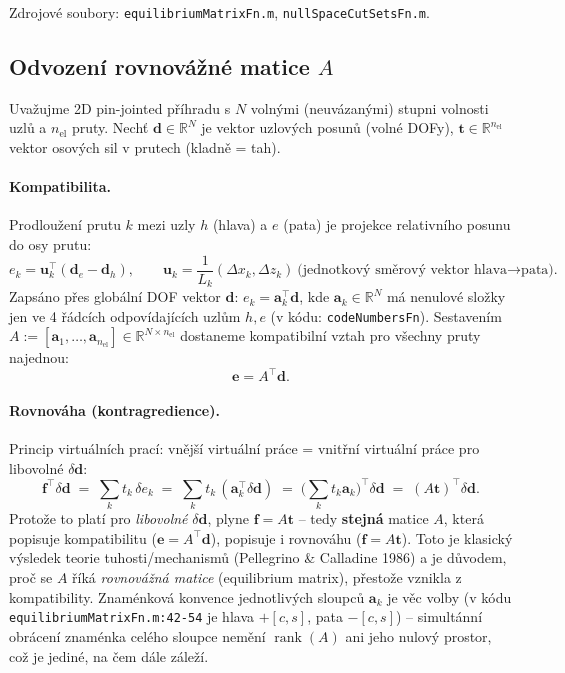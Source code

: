 \documentclass[11pt,a4paper]{article}
\newcommand{\R}{\mathbb{R}}
\newcommand{\code}[1]{\texttt{#1}}
\newcommand{\rank}{\operatorname{rank}}
\begin{document}
Zdrojové soubory: \code{equilibriumMatrixFn.m}, \code{nullSpaceCutSetsFn.m}.

\subsection{Odvození rovnovážné matice $A$}

Uvažujme 2D pin-jointed příhradu s $N$ volnými (neuvázanými) stupni volnosti uzlů a $n_{\mathrm{el}}$ pruty.
Nechť $\mathbf d\in\R^N$ je vektor uzlových posunů (volné DOFy), $\mathbf t\in\R^{n_{\mathrm{el}}}$ vektor
osových sil v prutech (kladně = tah).

\paragraph{Kompatibilita.} Prodloužení prutu $k$ mezi uzly $h$ (hlava) a $e$ (pata) je projekce relativního
posunu do osy prutu:
\[
  e_k = \mathbf u_k^\top(\mathbf d_e - \mathbf d_h), \qquad
  \mathbf u_k = \frac{1}{L_k}(\Delta x_k, \Delta z_k) \ \text{(jednotkový směrový vektor hlava→pata)}.
\]
Zapsáno přes globální DOF vektor $\mathbf d$: $e_k = \mathbf a_k^\top \mathbf d$, kde $\mathbf a_k\in\R^N$ má
nenulové složky jen ve 4 řádcích odpovídajících uzlům $h,e$ (v kódu: \code{codeNumbersFn}). Sestavením
$A := [\mathbf a_1,\dots,\mathbf a_{n_{\mathrm{el}}}]\in\R^{N\times n_{\mathrm{el}}}$ dostaneme kompatibilní
vztah pro všechny pruty najednou:
\[
  \mathbf e = A^\top \mathbf d.
\]

\paragraph{Rovnováha (kontragredience).} Princip virtuálních prací: vnější virtuální práce = vnitřní
virtuální práce pro libovolné $\delta\mathbf d$:
\[
  \mathbf f^\top \delta\mathbf d \;=\; \sum_k t_k\,\delta e_k \;=\; \sum_k t_k\,(\mathbf a_k^\top\delta\mathbf d)
  \;=\; \Big(\sum_k t_k \mathbf a_k\Big)^{\!\top}\delta\mathbf d \;=\; (A\mathbf t)^\top \delta\mathbf d.
\]
Protože to platí pro \emph{libovolné} $\delta \mathbf d$, plyne $\mathbf f = A\mathbf t$ -- tedy \textbf{stejná}
matice $A$, která popisuje kompatibilitu ($\mathbf e=A^\top\mathbf d$), popisuje i rovnováhu
($\mathbf f = A\mathbf t$). Toto je klasický výsledek teorie tuhosti/mechanismů (Pellegrino \& Calladine
1986) a je důvodem, proč se $A$ říká \emph{rovnovážná matice} (equilibrium matrix), přestože vznikla
z kompatibility. Znaménková konvence jednotlivých sloupců $\mathbf a_k$ je věc volby (v kódu
\code{equilibriumMatrixFn.m:42-54} je hlava $+[c,s]$, pata $-[c,s]$) -- simultánní obrácení znaménka
celého sloupce nemění $\rank(A)$ ani jeho nulový prostor, což je jediné, na čem dále záleží.
\end{document}
